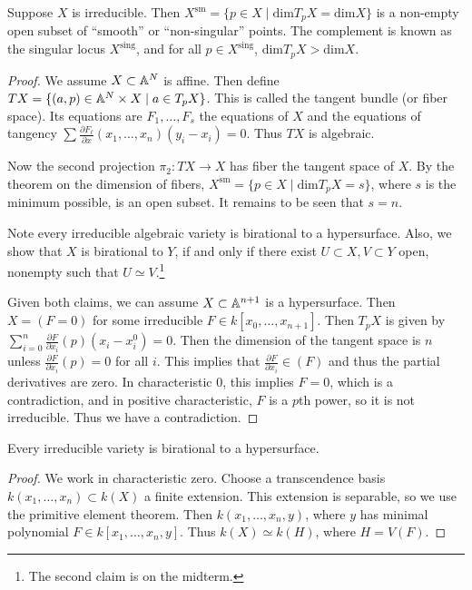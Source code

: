 \documentclass[twoside, 10pt]{article}
\begin{document}
    \begin{thm} Suppose $X$ is irreducible. Then $X^{\mathrm{sm}} = \{p \in X
        \mid \mathrm{dim}T_p X = \mathrm{dim} X \}$ is a non-empty open subset
        of ``smooth'' or ``non-singular'' points. The complement is known as
        the singular locus $X^{\mathrm{sing}}$, and for all $p \in
        X^{\mathrm{sing}}$, $\mathrm{dim}T_pX > \mathrm{dim} X$.  \begin{proof}
            We assume $X \subset \mathbb{A}^N$ is affine. Then define $TX = \{(a,p) \in
            \mathbb{A}^N \times X \mid a \in T_p X \}$. This is called the tangent
            bundle (or fiber space). Its equations are $F_1, \ldots, F_s$ the
            equations of $X$ and the equations of tangency $\sum \frac{\partial
            F_{\ell}}{\partial x}(x_1, \ldots, x_n) (y_i-x_i) = 0$. Thus $TX$
            is algebraic.

            Now the second projection $\pi_2: TX \to X$ has fiber the tangent
            space of $X$. By the theorem on the dimension of fibers,
            $X^{\mathrm{sm}} = \{p \in X \mid \mathrm{dim}T_pX = s\}$, where
            $s$ is the minimum possible, is an open subset. It remains to be
            seen that $s = n$.

            Note every irreducible algebraic variety is birational to a
            hypersurface. Also, we show that $X$ is birational to $Y$, if and
            only if there exist $U \subset X, V \subset Y$ open, nonempty such
            that $U \simeq V$.\footnote{The second claim is on the midterm.}

            Given both claims, we can assume $X \subset \mathbb{A}^{n+1}$ is a
            hypersurface. Then $X = (F=0)$ for some irreducible $F \in k[x_0,
            \ldots, x_{n+1}]$. Then $T_pX$ is given by $\sum_{i=0}^n
            \frac{\partial F}{\partial x_i}(p)(x_i - x_i^0) = 0$. Then the
            dimension of the tangent space is $n$ unless $\frac{\partial
            F}{\partial x_i}(p) = 0$ for all $i$. This implies that
            $\frac{\partial F}{\partial x_i} \in (F)$ and thus the partial
            derivatives are zero. In characteristic $0$, this implies $F = 0$,
            which is a contradiction, and in positive characteristic, $F$ is a
            $p$th power, so it is not irreducible. Thus we have a
        contradiction.  \end{proof} \end{thm}

    \begin{lem} Every irreducible variety is birational to a hypersurface.
        \begin{proof} We work in characteristic zero. Choose a transcendence
            basis $k(x_1, \ldots, x_n) \subset k(X)$ a finite extension. This
            extension is separable, so we use the primitive element theorem.
        Then $k(x_1, \ldots, x_n, y)$, where $y$ has minimal polynomial $F \in
    k[x_1, \ldots, x_n, y]$. Thus $k(X) \simeq k(H)$, where $H = V(F)$.
\end{proof} \end{lem}
\end{document}
